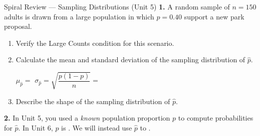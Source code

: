 \documentclass[10pt]{article}
\begin{document}
\namedateperiod

\vspace{0.15in}

\begin{notesbox}{Spiral Review --- Sampling Distributions (Unit 5)}
\textbf{1.} A random sample of $n = 150$ adults is drawn from a large population in which
$p = 0.40$ support a new park proposal.

\begin{enumerate}[label=\alph*.]
  \item Verify the Large Counts condition for this scenario.

  \item Calculate the mean and standard deviation of the sampling distribution of $\hat p$.

        $\mu_{\hat p} = $  \hfill
        $\sigma_{\hat p} = \sqrt{\dfrac{p(1-p)}{n}} = $ 

  \item Describe the shape of the sampling distribution of $\hat p$.
\end{enumerate}

\vspace{0.14in}
\textbf{2.} In Unit 5, you used a \emph{known} population proportion $p$ to compute
probabilities for $\hat p$. In Unit 6, $p$ is . We will
instead use $\hat p$ to .
\end{notesbox}
\end{document}
